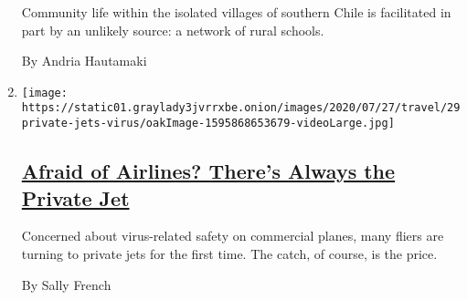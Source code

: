 \begin{enumerate}
  Community life within the isolated villages of southern Chile is
  facilitated in part by an unlikely source: a network of rural schools.

  By Andria Hautamaki
\item
  \texttt{[image: https://static01.graylady3jvrrxbe.onion/images/2020/07/27/travel/29private-jets-virus/oakImage-1595868653679-videoLarge.jpg]}

  \hypertarget{afraid-of-airlines-theres-always-the-private-jet}{%
  \subsection{\texorpdfstring{\href{/2020/07/30/travel/private-jets-coronavirus.html}{Afraid
  of Airlines? There's Always the Private
  Jet}}{Afraid of Airlines? There's Always the Private Jet}}\label{afraid-of-airlines-theres-always-the-private-jet}}

  Concerned about virus-related safety on commercial planes, many fliers
  are turning to private jets for the first time. The catch, of course,
  is the price.

  By Sally French
\end{enumerate}

